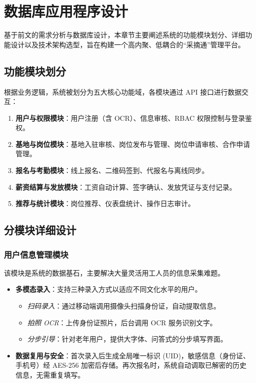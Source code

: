 \documentclass[UTF8,a4paper,12pt]{article}
\begin{document}
\section{数据库应用程序设计}

基于前文的需求分析与数据库设计，本章节主要阐述系统的功能模块划分、详细功能设计以及技术架构选型，旨在构建一个高内聚、低耦合的“采摘通”管理平台。

\subsection{功能模块划分}
根据业务逻辑，系统被划分为五大核心功能域，各模块通过 API 接口进行数据交互：

\begin{enumerate}
    \item \textbf{用户与权限模块}：用户注册（含 OCR）、信息审核、RBAC 权限控制与登录鉴权。
    \item \textbf{基地与岗位模块}：基地入驻审核、岗位发布与管理、岗位申请审核、合作申请管理。
    \item \textbf{报名与考勤模块}：线上报名、二维码签到、代报名与离线同步。
    \item \textbf{薪资结算与发放模块}：工资自动计算、签字确认、发放凭证与支付记录。
    \item \textbf{推荐与统计模块}：岗位推荐、仪表盘统计、操作日志审计。
\end{enumerate}

\subsection{分模块详细设计}

\subsubsection{用户信息管理模块}
该模块是系统的数据基石，主要解决大量灵活用工人员的信息采集难题。
\begin{itemize}
    \item \textbf{多模态录入}：支持三种录入方式以适应不同文化水平的用户。
    \begin{itemize}
        \item \textit{扫码录入}：通过移动端调用摄像头扫描身份证，自动提取信息。
        \item \textit{拍照 OCR}：上传身份证照片，后台调用 OCR 服务识别文字。
        \item \textit{分步引导}：针对老年用户，提供大字体、问答式的分步填写界面。
    \end{itemize}
    \item \textbf{数据复用与安全}：首次录入后生成全局唯一标识 (UID)，敏感信息（身份证、手机号）经 AES-256 加密后存储。再次报名时，系统自动调取已解密的历史信息，无需重复填写。
\end{itemize}
\end{document}
